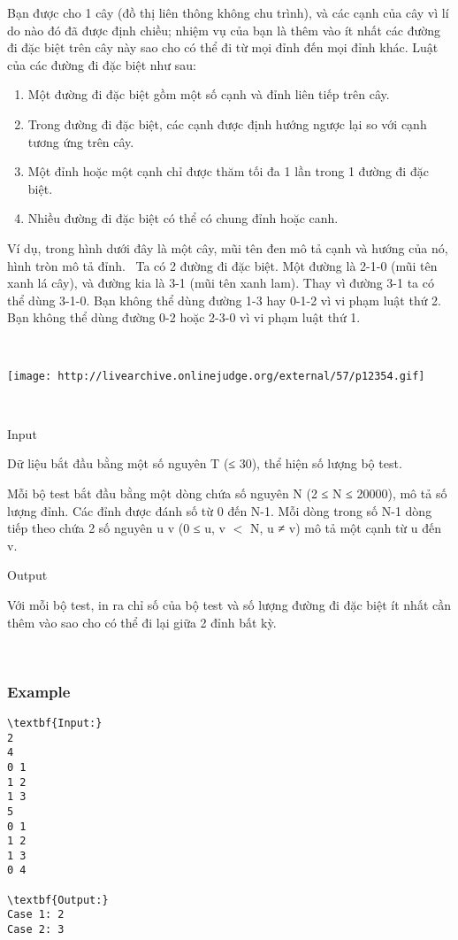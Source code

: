 

Bạn được cho 1 cây (đồ thị liên thông không chu trình), và các cạnh của cây vì lí do nào đó đã được định chiều; nhiệm vụ của bạn là thêm vào ít nhất các đường đi đặc biệt trên cây này sao cho có thể đi từ mọi đỉnh đến mọi đỉnh khác. Luật của các đường đi đặc biệt như sau:
\begin{enumerate}
	\item 

Một đường đi đặc biệt gồm một số cạnh và đỉnh liên tiếp trên cây.
	\item 

Trong đường đi đặc biệt, các cạnh được định hướng ngược lại so với cạnh tương ứng trên cây.
	\item 

Một đỉnh hoặc một cạnh chỉ được thăm tối đa 1 lần trong 1 đường đi đặc biệt.
	\item 

Nhiều đường đi đặc biệt có thể có chung đỉnh hoặc canh.
\end{enumerate}

Ví dụ, trong hình dưới đây là một cây, mũi tên đen mô tả cạnh và hướng của nó, hình tròn mô tả đỉnh.  Ta có 2 đường đi đặc biệt. Một đường là 2-1-0 (mũi tên xanh lá cây), và đường kia là 3-1 (mũi tên xanh lam). Thay vì đường 3-1 ta có thể dùng 3-1-0. Bạn không thể dùng đường 1-3 hay 0-1-2 vì vi phạm luật thứ 2. Bạn không thể dùng đường 0-2 hoặc 2-3-0 vì vi phạm luật thứ 1.

 


\texttt{[image: http://livearchive.onlinejudge.org/external/57/p12354.gif]}

 

Input


Dữ liệu bắt đầu bằng một số nguyên T (≤ 30), thể hiện số lượng bộ test.

Mỗi bộ test bắt đầu bằng một dòng chứa số nguyên N (2 ≤ N ≤ 20000), \textbf{} mô tả số lượng đỉnh. Các đỉnh được đánh số từ 0 đến N-1. Mỗi dòng trong số N-1 dòng tiếp theo chứa 2 số nguyên u v (0 ≤ u, v $<$ N, u ≠ v) mô tả một cạnh từ u đến v.

Output

Với mỗi bộ test, in ra chỉ số của bộ test và số lượng đường đi đặc biệt ít nhất cần thêm vào sao cho có thể đi lại giữa 2 đỉnh bất kỳ.

 

\subsubsection{Example}
\begin{verbatim}
\textbf{Input:}
2 
4 
0 1
1 2 
1 3 
5 
0 1 
1 2 
1 3 
0 4 

\textbf{Output:}
Case 1: 2
Case 2: 3\end{verbatim}

